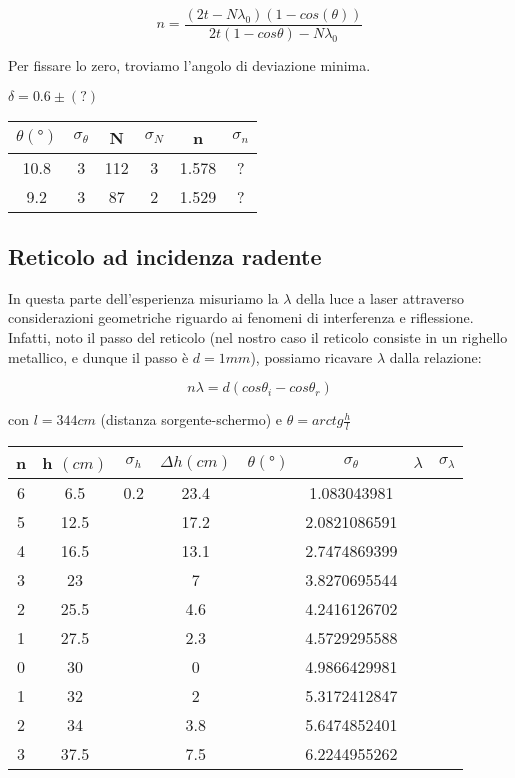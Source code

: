\documentclass[a4paper,10pt]{report}
\begin{document}
$$n=\frac{(2t-N\lambda_0)(1-cos(\theta))}{2t(1-cos\theta)-N\lambda_0}$$

Per fissare lo zero, troviamo l'angolo di deviazione minima.

$\delta = 0.6 \pm (?) $

\begin{center}
\begin{tabular}{c|c|c|c|c|c}
$\theta (°) $ & $\sigma_{\theta}$ & N & $\sigma_{N}$ & n & $\sigma_{n}$\\
\midrule
10.8 & 3 & 112 & 3 & 1.578 & ? \\
9.2 & 3 & 87 & 2 & 1.529 & ? \\
\end{tabular}
\end{center}

\subsection{Reticolo ad incidenza radente}

In questa parte dell'esperienza misuriamo la $\lambda$ della luce a laser attraverso considerazioni geometriche riguardo ai fenomeni di interferenza e riflessione. Infatti, noto il passo del reticolo (nel nostro caso il reticolo consiste in un righello metallico, e dunque il passo è $d = 1 mm$), possiamo ricavare $\lambda$ dalla relazione:

$$ n\lambda = d(cos\theta_i-cos\theta_r) $$

con $l = 344 cm $ (distanza sorgente-schermo) e $\theta = arctg\frac{h}{l}$

\begin{center}
\begin{tabular}{c|c|c|c|c|c|c|c}

n & h $(cm)$ & $\sigma_h$ & $\Delta h (cm)$ & $\theta (°)$ & $\sigma_{\theta}$ & $\lambda$ & $\sigma_{\lambda}$\\
\midrule

6	& 6.5	& 0.2 &	23.4 & &	1.083043981  & &\\
5	& 12.5	& &	17.2 & &	2.0821086591 & &\\
4	& 16.5	& &	13.1 & &	2.7474869399 & &\\
3	& 23	& &	7    & & 	3.8270695544 & &\\
2	& 25.5	& &	4.6  & &	4.2416126702 & &\\
1	& 27.5	& &	2.3	 & &	4.5729295588 & &\\
0	& 30	& &	0 	 & &	4.9866429981 & &\\
1	& 32	& &	2 	 & &	5.3172412847 & &\\
2	& 34	& &	3.8	 & & 	5.6474852401 & &\\
3	& 37.5	& &	7.5	 & &	6.2244955262 & &\\

\end{tabular}
\end{center}
				
\end{document}
